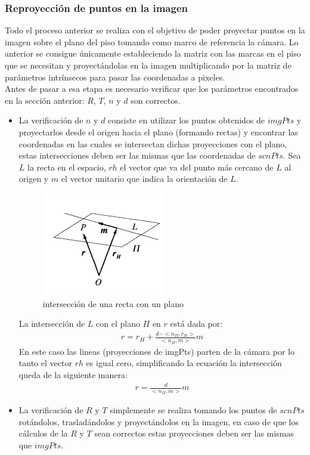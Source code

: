        	\subsubsection{Reproyección de puntos en la imagen} \label{repPtsIm}
       	Todo el proceso anterior se realiza con el objetivo de poder proyectar puntos en la imagen sobre el plano del piso tomando como marco de referencia la cámara. Lo anterior se consigue únicamente estableciendo la matriz con las marcas en el piso que se necesitan y proyectándolas en la imagen multiplicando por la matriz de parámetros intrínsecos para pasar las coordenadas a pixeles.\\
       	Antes de pasar a esa etapa es necesario verificar que los parámetros encontrados en la sección anterior: $R$, $T$, $n$ y $d$ son correctos. 
       	\begin{itemize}
       		\item La verificación de $n$ y $d$ consiste en utilizar los puntos obtenidos de $imgPts$ y proyectarlos desde el origen hacia el plano (formando rectas) y encontrar las coordenadas en las cuales se intersectan dichas proyecciones con el plano, estas intersecciones deben ser las mismas que las coordenadas de $scnPts$. Sea $L$ la recta en el espacio, $rh$ el vector que va del punto más cercano de $L$ al origen y $m$ el vector unitario que indica la orientación de $L$. 
       		\begin{figure}[htbp]
       			\centering
       			\includegraphics[width=.35\textwidth]{./pictures/intersec}
       			\caption{intersección de una recta con un plano}\label{fig: figura}
       		\end{figure}
       		
       		La intersección de $L$ con el plano $\Pi$ en $r$ está dada por:
       		\begin{eqnarray}
       		r=r_H+\frac{d-<n_{\Pi}, r_H>}{<n_{\Pi},m>}m
       		\end{eqnarray}
       		En este caso las lineas (proyecciones de imgPts) parten de la cámara por lo tanto el vector $rh$ es igual cero, simplificando la ecuación la intersección queda de la siguiente manera:
       		\begin{eqnarray}
       		r=\frac{d}{<n_{\Pi},m>}m
       		\end{eqnarray}	
       		
       		\item La verificación de $R$ y $T$ simplemente se realiza tomando los puntos de $scnPts$ rotándolos, trasladándolos y proyectándolos en la imagen, en caso de que los cálculos de la $R$ y $T$ sean correctos estas proyecciones deben ser las mismas que $imgPts$.
       	\end{itemize}


